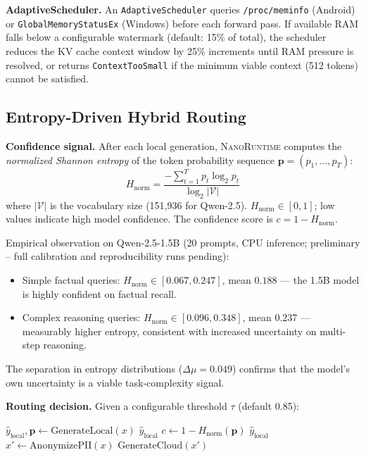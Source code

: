 \documentclass[11pt]{article}
\newcommand{\nanort}{\textsc{NanoRuntime}}
\begin{document}
\textbf{AdaptiveScheduler.}
An \texttt{AdaptiveScheduler} queries \texttt{/proc/meminfo} (Android)
or \texttt{GlobalMemoryStatusEx} (Windows) before each forward pass.
If available RAM falls below a configurable watermark
(default: 15\% of total), the scheduler reduces the KV cache
context window by 25\% increments until RAM pressure is resolved,
or returns \texttt{ContextTooSmall} if the minimum viable context
(512 tokens) cannot be satisfied.

\subsection{Entropy-Driven Hybrid Routing}
\label{sec:routing}

\textbf{Confidence signal.}
After each local generation, \nanort{} computes the \emph{normalized
Shannon entropy} of the token probability sequence
$\mathbf{p} = (p_1, \ldots, p_T)$:
\begin{equation}
  H_{\text{norm}} = \frac{-\sum_{t=1}^{T} p_t \log_2 p_t}{\log_2 |\mathcal{V}|}
  \label{eq:entropy}
\end{equation}
where $|\mathcal{V}|$ is the vocabulary size (151,936 for Qwen-2.5).
$H_{\text{norm}} \in [0, 1]$; low values indicate high model confidence.
The confidence score is $c = 1 - H_{\text{norm}}$.

Empirical observation on Qwen-2.5-1.5B (20 prompts, CPU inference;
preliminary -- full calibration and reproducibility runs pending):
\begin{itemize}
  \item Simple factual queries: $H_{\text{norm}} \in [0.067, 0.247]$,
    mean $0.188$ — the 1.5B model is highly confident on factual recall.
  \item Complex reasoning queries: $H_{\text{norm}} \in [0.096, 0.348]$,
    mean $0.237$ — measurably higher entropy, consistent with
    increased uncertainty on multi-step reasoning.
\end{itemize}
The separation in entropy distributions ($\Delta\mu = 0.049$)
confirms that the model's own uncertainty is a viable task-complexity signal.

\textbf{Routing decision.}
Given a configurable threshold $\tau$ (default 0.85):
\begin{algorithm}[H]
\caption{\nanort{} Routing Decision}
\label{alg:routing}
\begin{algorithmic}[1]
\State $\hat{y}_{\text{local}}, \mathbf{p} \gets \text{GenerateLocal}(x)$
 \Return $\hat{y}_{\text{local}}$ \EndIf
\State $c \gets 1 - H_{\text{norm}}(\mathbf{p})$
 \Return $\hat{y}_{\text{local}}$ \EndIf
\State $x' \gets \text{AnonymizePII}(x)$
\State \Return $\text{GenerateCloud}(x')$
\end{algorithmic}
\end{algorithm}
\end{document}
